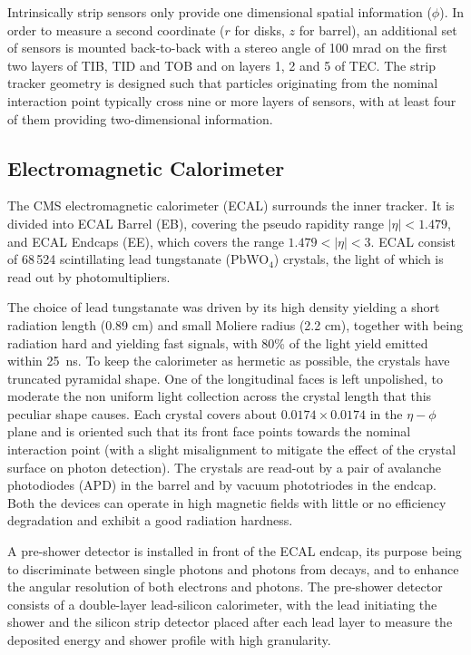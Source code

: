 Intrinsically strip sensors only provide one dimensional spatial information ($\phi$). In order to measure a second coordinate ($r$ for disks, $z$ for barrel), an additional set of sensors is mounted back-to-back with a stereo angle of 100 mrad on the first two layers of TIB, TID and TOB and on layers 1, 2 and 5 of TEC. The strip tracker geometry is designed such that particles originating from the nominal interaction point typically cross nine or more layers of sensors, with at least four of them providing two-dimensional information.


\subsection{Electromagnetic Calorimeter}

The CMS electromagnetic calorimeter (ECAL) surrounds the inner tracker. It is divided into ECAL Barrel (EB), covering the pseudo rapidity range $|\eta| < 1.479$, and ECAL Endcaps (EE), which covers the range $1.479 < |\eta| < 3$. 
ECAL consist of 68\,524 scintillating lead tungstanate (PbWO$_4$) crystals, the light of which is read out by photomultipliers. 

The choice of lead tungstanate was driven by its high density yielding a short radiation length (0.89 cm) and small Moliere radius (2.2 cm), together with being radiation hard and yielding fast signals, with 80\% of the light yield emitted within 25~ns. To keep the calorimeter as hermetic as possible, the crystals have truncated pyramidal shape. One of the longitudinal faces is left unpolished, to moderate the non uniform light collection across the crystal length that this peculiar shape causes. Each crystal covers about $0.0174 \times 0.0174$ in the $\eta-\phi$ plane and is oriented such that its front face points towards the nominal interaction point (with a slight misalignment to mitigate the effect of the crystal surface on photon detection). The crystals are read-out by a pair of avalanche photodiodes (APD) in the barrel and by vacuum phototriodes in the endcap. Both the devices can operate in high magnetic fields with little or no efficiency degradation and exhibit a good radiation hardness.

A pre-shower detector is installed in front of the ECAL endcap, its purpose being to discriminate between single photons and photons from \piz decays, and to enhance the angular resolution of both electrons and photons. The pre-shower detector consists of a double-layer lead-silicon calorimeter, with the lead initiating the shower and the silicon strip detector placed after each lead layer to measure the deposited energy and shower profile with high granularity.

